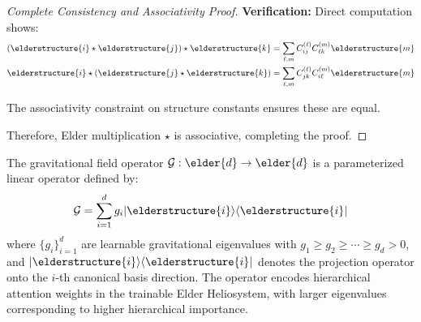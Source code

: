 \begin{proof}[Complete Consistency and Associativity Proof]
\textbf{Verification:} Direct computation shows:
\begin{align}
(\elderstructure{i} \star \elderstructure{j}) \star \elderstructure{k} &= \sum_{\ell,m} C_{ij}^{(\ell)} C_{\ell k}^{(m)} \elderstructure{m}\\
\elderstructure{i} \star (\elderstructure{j} \star \elderstructure{k}) &= \sum_{\ell,m} C_{jk}^{(\ell)} C_{i\ell}^{(m)} \elderstructure{m}
\end{align}

The associativity constraint on structure constants ensures these are equal.

Therefore, Elder multiplication $\star$ is associative, completing the proof.
\end{proof}

\begin{definition}
The gravitational field operator $\mathcal{G}: \elder{d} \rightarrow \elder{d}$ is a parameterized linear operator defined by:
\begin{equation}
\mathcal{G} = \sum_{i=1}^{d} g_i |\elderstructure{i}\rangle\langle\elderstructure{i}|
\end{equation}
where $\{g_i\}_{i=1}^{d}$ are learnable gravitational eigenvalues with $g_1 \geq g_2 \geq \cdots \geq g_d > 0$, and $|\elderstructure{i}\rangle\langle\elderstructure{i}|$ denotes the projection operator onto the $i$-th canonical basis direction. The operator encodes hierarchical attention weights in the trainable Elder Heliosystem, with larger eigenvalues corresponding to higher hierarchical importance.
\end{definition}


